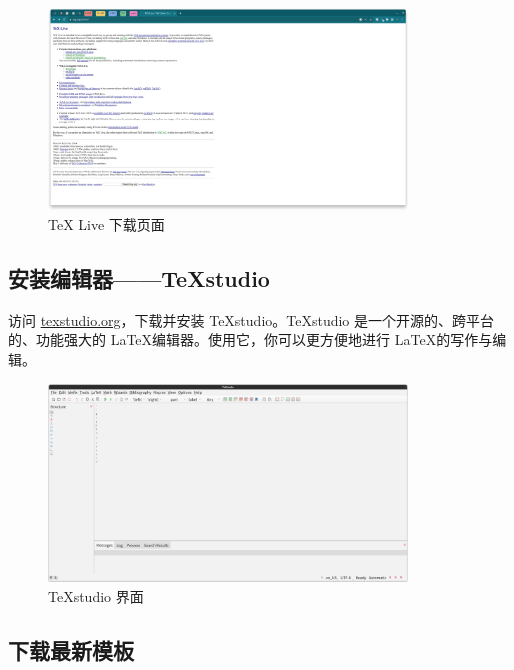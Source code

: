 \begin{figure}[H]
  \begin{center}
    \includegraphics[width=0.85\textwidth]{imgs/local-texlive-download.png}
  \end{center}
  \caption{TeX Live 下载页面}
  \label{fig:local-texlive-download}
\end{figure}

\clearpage
\subsection{安装编辑器——TeXstudio}

访问 \href{https://texstudio.org}{texstudio.org}，下载并安装 TeXstudio。TeXstudio 是一个开源的、跨平台的、功能强大的 \LaTeX 编辑器。使用它，你可以更方便地进行 \LaTeX 的写作与编辑。

\begin{figure}[H]
  \begin{center}
    \includegraphics[width=0.85\textwidth]{imgs/texstudio-overview.png}
  \end{center}
  \caption{TeXstudio 界面}
  \label{fig:texstudio-overview}
\end{figure}

\subsection{下载最新模板} \label{sec:download}

